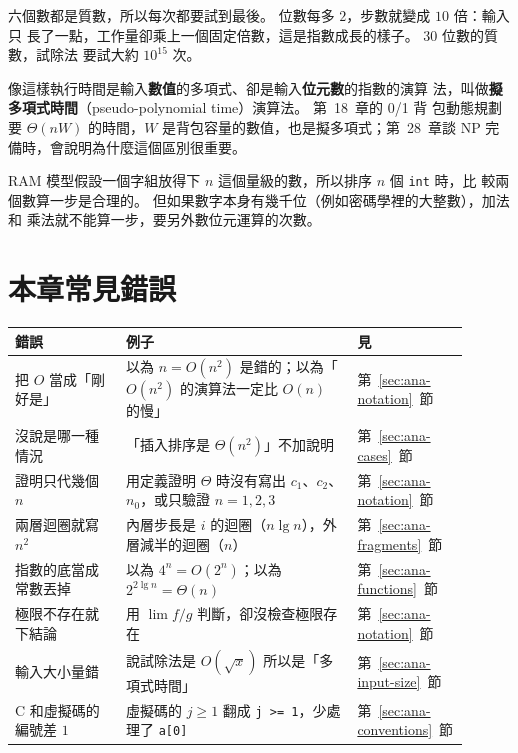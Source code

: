 六個數都是質數，所以每次都要試到最後。 位數每多 $2$，步數就變成 $10$ 倍：輸入只
長了一點，工作量卻乘上一個固定倍數，這是指數成長的樣子。 $30$ 位數的質數，試除法
要試大約 $10^{15}$ 次。

像這樣執行時間是輸入\textbf{數值}的多項式、卻是輸入\textbf{位元數}的指數的演算
法，叫做\textbf{擬多項式時間}（pseudo-polynomial time）演算法。 第~18~章的 0/1 背
包動態規劃要 $\Theta(nW)$ 的時間，$W$ 是背包容量的數值，也是擬多項式；第~28~章談
NP 完備時，會說明為什麼這個區別很重要。

RAM 模型假設一個字組放得下 $n$ 這個量級的數，所以排序 $n$ 個 \texttt{int} 時，比
較兩個數算一步是合理的。 但如果數字本身有幾千位（例如密碼學裡的大整數），加法和
乘法就不能算一步，要另外數位元運算的次數。

\section{本章常見錯誤}
\label{sec:ana-pitfalls}

\begin{center}
\begin{tabular}{>{\raggedright\arraybackslash}p{0.24\linewidth}>{\raggedright\arraybackslash}p{0.50\linewidth}p{0.16\linewidth}}
\toprule
錯誤 & 例子 & 見 \\
\midrule
把 $O$ 當成「剛好是」 & 以為 $n = O(n^2)$ 是錯的；以為「$O(n^2)$ 的演算法一定比
$O(n)$ 的慢」 & 第~\ref{sec:ana-notation}~節 \\
沒說是哪一種情況 & 「插入排序是 $\Theta(n^2)$」不加說明 &
第~\ref{sec:ana-cases}~節 \\
證明只代幾個 $n$ & 用定義證明 $\Theta$ 時沒有寫出 $c_1$、$c_2$、$n_0$，或只驗證
$n = 1, 2, 3$ & 第~\ref{sec:ana-notation}~節 \\
兩層迴圈就寫 $n^2$ & 內層步長是 $i$ 的迴圈（$n \lg n$），外層減半的迴圈（$n$）&
第~\ref{sec:ana-fragments}~節 \\
指數的底當成常數丟掉 & 以為 $4^n = O(2^n)$；以為 $2^{2\lg n} = \Theta(n)$ &
第~\ref{sec:ana-functions}~節 \\
極限不存在就下結論 & 用 $\lim f/g$ 判斷，卻沒檢查極限存在 &
第~\ref{sec:ana-notation}~節 \\
輸入大小量錯 & 說試除法是 $O(\sqrt{x})$ 所以是「多項式時間」 &
第~\ref{sec:ana-input-size}~節 \\
C 和虛擬碼的編號差 $1$ & 虛擬碼的 $j \ge 1$ 翻成 \texttt{j >= 1}，少處理了
\texttt{a[0]} & 第~\ref{sec:ana-conventions}~節 \\
\bottomrule
\end{tabular}
\end{center}

